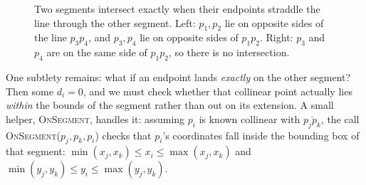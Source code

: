 \begin{figure}[htbp]
\centering
{}
\caption{Two segments intersect exactly when their endpoints straddle the line through the other segment. Left: $p_1, p_2$ lie on opposite sides of the line $p_3 p_4$, and $p_3, p_4$ lie on opposite sides of $p_1 p_2$. Right: $p_3$ and $p_4$ are on the same side of $p_1 p_2$, so there is no intersection.}
\label{ch32:fig-straddle}
\end{figure}

One subtlety remains: what if an endpoint lands \emph{exactly} on the other
segment? Then some $d_i = 0$, and we must check whether that collinear point
actually lies \emph{within} the bounds of the segment rather than out on its
extension. A small helper, \textsc{OnSegment}, handles it: assuming $p_i$ is
known collinear with $\overline{p_j p_k}$, the call \textsc{OnSegment}($p_j, p_k, p_i$)
checks that $p_i$'s coordinates fall inside the bounding box of that segment:
$\min(x_j,x_k) \le x_i \le \max(x_j,x_k)$ and
$\min(y_j,y_k) \le y_i \le \max(y_j,y_k)$.


